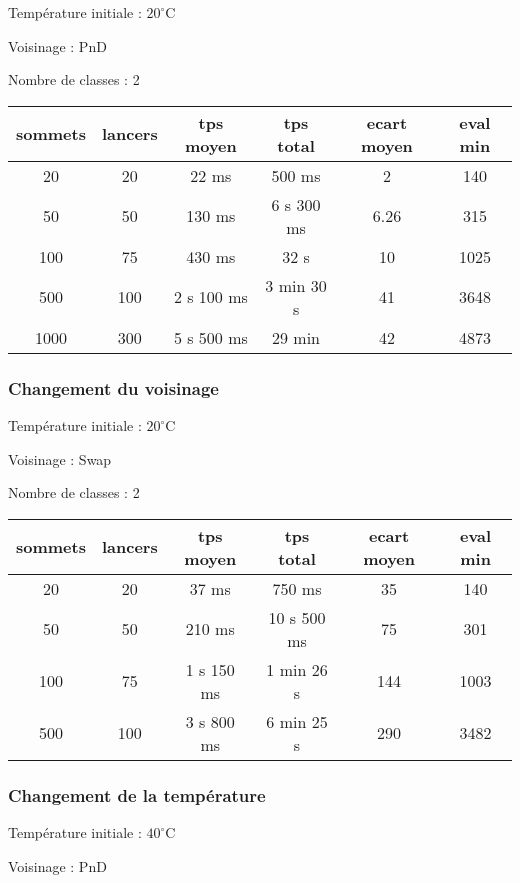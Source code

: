 \documentclass[12pt]{article}
\begin{document}
\bigskip
Température initiale : $20^\circ$C

Voisinage : PnD

Nombre de classes : 2
\bigskip

\begin{tabular}{|c|c|c|c|c|c|}
	\hline 
	sommets & lancers & tps moyen & tps total & ecart moyen & eval min\\
	\hline
20 & 20 & 22 ms & 500 ms & 2 & 140 \\ 
	\hline
	 50  &  50  &   130  ms   &   6 s  300  ms   &   6.26  &   315  \\
	\hline
100  &  75  &   430  ms   &  32 s  &  10   &   1025  \\ 
	\hline
500  &  100  & 2 s 100 ms  &  3 min 30  s &  41  &   3648  \\
	\hline
	1000  &  300  &  5 s 500 ms &  29 min &  42   &   4873  \\ 
	\hline
\end{tabular}
\bigskip

\subsubsection*{Changement du voisinage}

Température initiale : $20^\circ$C

Voisinage : Swap

Nombre de classes : 2
\bigskip

\begin{tabular}{|c|c|c|c|c|c|}
	\hline 
	sommets & lancers & tps moyen & tps total & ecart moyen & eval min\\
	\hline
	20 & 20 & 37 ms & 750 ms & 35 & 140 \\
	\hline
	 50  &  50  &   210  ms   &   10 s  500  ms   &  75   &   301  \\
	\hline
	 100  &  75  & 1 s 150  ms   &  1 min 26 s &  144   &   1003  \\
	\hline
	 500  &  100  & 3 s 800  ms  &  6 min 25  s &   290  &   3482  \\
	\hline
\end{tabular}
\bigskip

\subsubsection*{Changement de la température}

Température initiale : $40^\circ$C

Voisinage : PnD
\end{document}
